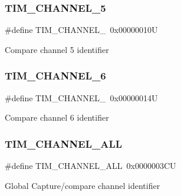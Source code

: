\subsubsection{\texorpdfstring{TIM\_CHANNEL\_5}{TIM\_CHANNEL\_5}}
{\footnotesize\ttfamily \#define T\+I\+M\+\_\+\+C\+H\+A\+N\+N\+E\+L\+\_~0x00000010U}

Compare channel 5 identifier \mbox{\label{group___t_i_m___channel_gaf1042743f56a664b152ff0a03597807e}} 
\subsubsection{\texorpdfstring{TIM\_CHANNEL\_6}{TIM\_CHANNEL\_6}}
{\footnotesize\ttfamily \#define T\+I\+M\+\_\+\+C\+H\+A\+N\+N\+E\+L\+\_~0x00000014U}

Compare channel 6 identifier \mbox{\label{group___t_i_m___channel_ga6abf8f9fc695b79d8781ca082dfb48bc}} 
\subsubsection{\texorpdfstring{TIM\_CHANNEL\_ALL}{TIM\_CHANNEL\_ALL}}
{\footnotesize\ttfamily \#define T\+I\+M\+\_\+\+C\+H\+A\+N\+N\+E\+L\+\_\+\+A\+LL~0x0000003\+CU}

Global Capture/compare channel identifier 